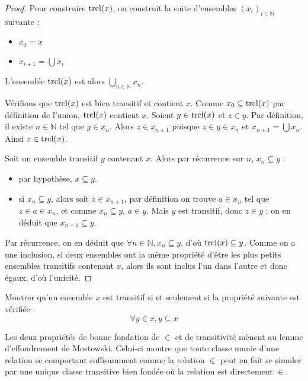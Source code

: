 \begin{proof}
  Pour construire $\operatorname{trcl}(x)$, on construit la suite d'ensembles
  $(x_i)_{i\in\mathbb N}$ suivante :
  \begin{itemize}
  \item $x_0 = x$
  \item $x_{i+1} = \bigcup x_i$
  \end{itemize}
  L'ensemble $\operatorname{trcl}(x)$ est alors $\displaystyle\bigcup_{n\in \mathbb N} x_n$.

  Vérifions que $\operatorname{trcl}(x)$ est bien transitif et contient $x$. Comme
  $x_0\subseteq \operatorname{trcl}(x)$ par définition de l'union, $\operatorname{trcl}(x)$ contient $x$.
  Soient $y\in \operatorname{trcl}(x)$ et $z\in y$. Par définition, il existe $n\in \mathbb N$
  tel que $y\in x_n$. Alors $z\in x_{n+1}$ puisque $z\in y \in x_n$ et
  $x_{n+1}=\bigcup x_n$. Ainsi $z\in \operatorname{trcl}(x)$.

  Soit un ensemble transitif $y$ contenant $x$. Alors par récurrence sur $n$,
  $x_n\subseteq y$ :
  \begin{itemize}
  \item par hypothèse, $x\subseteq y$.
  \item si $x_n\subseteq y$, alors soit $z\in x_{n+1}$, par définition on trouve
    $a\in x_n$ tel que $z\in a \in x_n$, et comme $x_n\subseteq y$, $a\in y$.
    Mais $y$ est transitif, donc $z\in y$ : on en déduit que
    $x_{n+1}\subseteq y$.
  \end{itemize}
  Par récurrence, on en déduit que $\forall n\in\mathbb N, x_n\subseteq y$,
  d'où $\operatorname{trcl}(x)\subseteq y$. Comme on a une inclusion, si deux ensembles ont la
  même propriété d'être les plus petits ensembles transitifs contenant $x$,
  alors ils sont inclus l'un dans l'autre et donc égaux, d'où l'unicité.
\end{proof}

\begin{exercise}
  Montrer qu'un ensemble $x$ est transitif si et seulement si la propriété
  suivante est vérifiée :
  \[\forall y\in x, y\subseteq x\]
\end{exercise}

Les deux propriétés de bonne fondation de $\in$ et de transitivité mènent au
lemme d'effondrement de Mostowski. Celui-ci montre que toute classe munie d'une
relation se comportant suffisamment comme la relation $\in$ peut en fait se
simuler par une unique classe transitive bien fondée où la relation est
directement $\in$.

